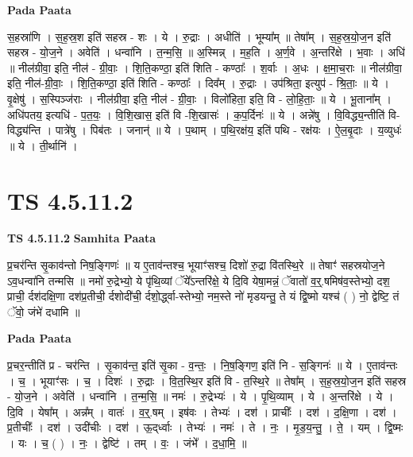 \documentclass[17pt]{extarticle}
\begin{document}
\textbf{Pada Paata} \newline

स॒हस्रा॑णि । स॒ह॒स्र॒श इति॑ सहस्र - शः । ये । रु॒द्राः । अधीति॑ । भूम्या᳚म् ॥ तेषा᳚म् । स॒ह॒स्र॒यो॒ज॒न इति॑ सहस्र - यो॒ज॒ने । अवेति॑ । धन्वा॑नि । त॒न्म॒सि॒ ॥ अ॒स्मिन्न् । म॒ह॒ति । अ॒र्ण॒वे । अ॒न्तरि॑क्षे । भ॒वाः । अधि॑ ॥ नील॑ग्रीवा॒ इति॒ नील॑ - ग्री॒वाः॒ । शि॒ति॒कण्ठा॒ इति॑ शिति - कण्ठाः᳚ । श॒र्वाः । अ॒धः । क्ष॒मा॒च॒राः ॥ नील॑ग्रीवा॒ इति॒ नील॑-ग्री॒वाः॒ । शि॒ति॒कण्ठा॒ इति॑ शिति - कण्ठाः᳚ । दिव᳚म् । रु॒द्राः । उप॑श्रिता॒ इत्युप॑ - श्रि॒ताः॒ ॥ ये । वृ॒क्षेषु॑ । स॒स्पिञ्ज॑राः । नील॑ग्रीवा॒ इति॒ नील॑ - ग्री॒वाः॒ । विलो॑हिता॒ इति॒ वि - लो॒हि॒ताः॒ ॥ ये । भू॒ताना᳚म् । अधि॑पतय॒ इत्यधि॑ - प॒त॒यः॒ । वि॒शि॒खास॒ इति॑ वि -शि॒खासः॑ । क॒प॒र्दिनः॑ ॥ ये । अन्ने॑षु । वि॒विद्ध्य॒न्तीति॑ वि-विद्ध्य॑न्ति । पात्रे॑षु । पिब॑तः । जनान्॑ ॥ ये । प॒थाम् । प॒थि॒रक्ष॑य॒ इति॑ पथि - रक्ष॑यः । ऐ॒ल॒बृ॒दाः । य॒व्युधः॑ ॥ ये । ती॒र्थानि॑ ।  \newline





\section{ TS 4.5.11.2 }

\textbf{TS 4.5.11.2 } \newline
\textbf{Samhita Paata} \newline

प्र॒चर॑न्ति सृ॒काव॑न्तो निष॒ङ्गिणः॑ ॥                                     य ए॒ताव॑न्तश्च॒ भूयाꣳ॑सश्च॒ दिशो॑ रु॒द्रा वि॑तस्थि॒रे ॥ तेषाꣳ॑ सहस्रयोज॒ने ऽव॒धन्वा॑नि तन्मसि ॥                                              नमो॑ रु॒द्रेभ्यो॒ ये पृ॑थि॒व्यां ॅये᳚ऽन्तरि॑क्षे॒ ये दि॒वि येषा॒मन्नं॒ ॅवातो॑ व॒र्॒.षमिष॑व॒स्तेभ्यो॒ दश॒ प्राची॒ र्दश॑दक्षि॒णा दश॑प्र॒तीची॒ र्दशोदी॑ची॒ र्दशो॒र्द्ध्वा-स्तेभ्यो॒ नम॒स्ते नो॑ मृडयन्तु॒ ते यं द्वि॒ष्मो यश्च॑ ( ) नो॒ द्वेष्टि॒ तं ॅवो॒ जंभे॑ दधामि ॥ \newline

\textbf{Pada Paata} \newline

प्र॒चर॒न्तीति॑ प्र - चर॑न्ति । सृ॒काव॑न्त॒ इति॑ सृ॒का - व॒न्तः॒ । नि॒ष॒ङ्गिण॒ इति॑ नि - स॒ङ्गिनः॑ ॥ ये । ए॒ताव॑न्तः । च॒ । भूयाꣳ॑सः । च॒ । दिशः॑ । रु॒द्राः । वि॒त॒स्थि॒र इति॑ वि - त॒स्थि॒रे ॥ तेषा᳚म् । स॒ह॒स्र॒यो॒ज॒न इति॑ सहस्र - यो॒ज॒ने । अवेति॑ । धन्वा॑नि । त॒न्म॒सि॒ ॥ नमः॑ । रु॒द्रेभ्यः॑ । ये । पृ॒थि॒व्याम् । ये । अ॒न्तरि॑क्षे । ये । दि॒वि । येषा᳚म् । अन्न᳚म् । वातः॑ । व॒र्॒.षम् । इष॑वः । तेभ्यः॑ । दश॑ । प्राचीः᳚ । दश॑ । द॒क्षि॒णा । दश॑ । प्र॒तीचीः᳚ । दश॑ । उदी॑चीः । दश॑ । ऊ॒द्‌र्ध्वाः । तेभ्यः॑ । नमः॑ । ते । नः॒ । मृ॒ड॒य॒न्तु॒ । ते॒ । यम् । द्वि॒ष्मः । यः । च॒ ( ) । नः॒ । द्वेष्टि॑ । तम् । वः॒ । जंभे᳚ । द॒धा॒मि॒ ॥  \newline
\end{document}
